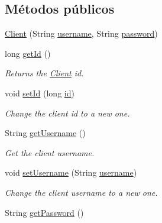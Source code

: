 \subsection*{Métodos públicos}
\begin{DoxyCompactItemize}
\item 
\mbox{\hyperlink{classcom_1_1ruralhousejsf_1_1domain_1_1_client_a57bf8892cfbb684bcda11d6bb786871b}{Client}} (String \mbox{\hyperlink{classcom_1_1ruralhousejsf_1_1domain_1_1_client_a0d105bbb8e72c4a5b70ec43f59227882}{username}}, String \mbox{\hyperlink{classcom_1_1ruralhousejsf_1_1domain_1_1_client_a1914bdf0282fd4a34b890a6fb775619e}{password}})
\item 
long \mbox{\hyperlink{classcom_1_1ruralhousejsf_1_1domain_1_1_client_a522bbbbe3b397983a76056b4350126df}{get\+Id}} ()
\begin{DoxyCompactList}\small\item\em Returns the \mbox{\hyperlink{classcom_1_1ruralhousejsf_1_1domain_1_1_client}{Client}} id. \end{DoxyCompactList}\item 
void \mbox{\hyperlink{classcom_1_1ruralhousejsf_1_1domain_1_1_client_a0e4914e375b61e50427b5fbd15c0948f}{set\+Id}} (long \mbox{\hyperlink{classcom_1_1ruralhousejsf_1_1domain_1_1_client_ab353a203ee0d84148e34fbb27ff0dbb8}{id}})
\begin{DoxyCompactList}\small\item\em Change the client id to a new one. \end{DoxyCompactList}\item 
String \mbox{\hyperlink{classcom_1_1ruralhousejsf_1_1domain_1_1_client_a0ae33acded961afcf93152d917bf1aa1}{get\+Username}} ()
\begin{DoxyCompactList}\small\item\em Get the client username. \end{DoxyCompactList}\item 
void \mbox{\hyperlink{classcom_1_1ruralhousejsf_1_1domain_1_1_client_acf233b95ed06204b7724cc7d277352ab}{set\+Username}} (String \mbox{\hyperlink{classcom_1_1ruralhousejsf_1_1domain_1_1_client_a0d105bbb8e72c4a5b70ec43f59227882}{username}})
\begin{DoxyCompactList}\small\item\em Change the client username to a new one. \end{DoxyCompactList}\item 
String \mbox{\hyperlink{classcom_1_1ruralhousejsf_1_1domain_1_1_client_a5ecd4e7fd82dec1d7348730379be6b54}{get\+Password}} ()

\end{DoxyCompactItemize}
